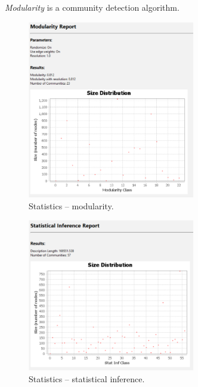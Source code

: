 \documentclass[12pt, a4paper]{article}
\begin{document}
\newpage

\textit{Modularity} is a community detection algorithm.
\begin{figure}[!h]
\centering
\includegraphics[width=0.65\textwidth]{s6p8.png}
\caption{Statistics -- modularity.}
\end{figure}

\begin{figure}[!h]
\centering
\includegraphics[width=0.65\textwidth]{s6p9.png}
\caption{Statistics -- statistical inference.}
\end{figure}

\newpage
\end{document}
